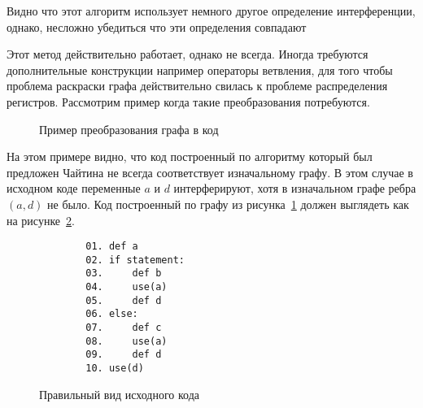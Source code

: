 \documentclass[12pt]{article}
\begin{document}
Видно что этот алгоритм использует немного другое определение интерференции, однако, несложно убедиться что эти определения
совпадают

Этот метод действительно работает, однако не всегда. Иногда требуются дополнительные конструкции например операторы ветвления,
для того чтобы проблема раскраски графа действительно свилась к проблеме распределения регистров. Рассмотрим пример когда такие
преобразования потребуются.

\begin{figure}[H]
    \centering
\caption{Пример преобразования графа в код}
\label{fig:ex2}
\end{figure}

На этом примере видно, что код построенный по алгоритму который был предложен Чайтина не
всегда соответствует изначальному графу. В этом случае в исходном коде переменные
$a$ и $d$ интерферируют, хотя в изначальном графе ребра $(a, d)$ не было. Код построенный
по графу из рисунка~\ref{fig:ex2} должен выглядеть как на рисунке~\ref{fig:right_ex2}.

\begin{figure}[H]
    \centering
    \lstset{basicstyle=\ttfamily\small, frame=single}
    \begin{lstlisting}
        01. def a
        02. if statement:
        03.     def b
        04.     use(a)
        05.     def d 
        06. else:
        07.     def c
        08.     use(a)
        09.     def d
        10. use(d)
    \end{lstlisting}
    \caption{Правильный вид исходного кода}
    \label{fig:right_ex2}
\end{figure}
\end{document}
